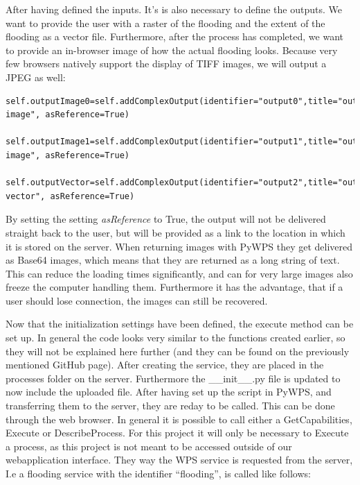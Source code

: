After having defined the inputs. It's is also necessary to define the outputs. We want to provide the user with a raster of the flooding and the extent of the flooding as a vector file. Furthermore, after the process has completed, we want to provide an in-browser image of how the actual flooding looks. Because very few browsers natively support the display of TIFF images, we will output a JPEG as well:\\


\begin{lstlisting}
self.outputImage0=self.addComplexOutput(identifier="output0",title="output image", asReference=True)

self.outputImage1=self.addComplexOutput(identifier="output1",title="output image", asReference=True)

self.outputVector=self.addComplexOutput(identifier="output2",title="output vector", asReference=True)

\end{lstlisting}

By setting the setting \textit{asReference} to True, the output will not be delivered straight back to the user, but will be provided as a link to the location in which it is stored on the server. When returning images with PyWPS they get delivered as Base64 images, which means that they are returned as a long string of text. This can reduce the loading times significantly, and can for very large images also freeze the computer handling them. Furthermore it has the advantage, that if a user should lose connection, the images can still be recovered. 

Now that the initialization settings have been defined, the execute method can be set up. In general the code looks very similar to the functions created earlier, so they will not be explained here further (and they can be found on the previously mentioned GitHub page). 
After creating the service, they are placed in the processes folder on the server. Furthermore the \_\_init\_\_.py file is updated to now include the uploaded file. 
After having set up the script in PyWPS, and transferring them to the server, they are reday to be called. This can be done through the web browser.
In general it is possible to call either a GetCapabilities, Execute or DescribeProcess. For this project it will only be necessary to Execute a process, as this project is not meant to be accessed outside of our webapplication interface. 
They way the WPS service is requested from the server, I.e a flooding service with the identifier “flooding”, is called like follows:

